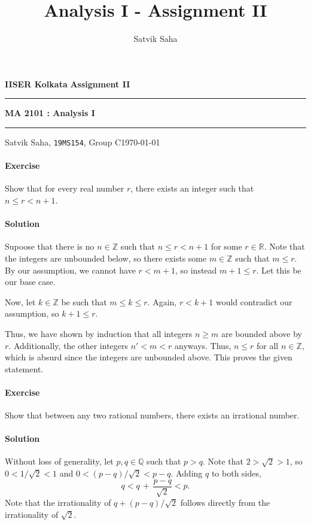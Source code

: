 \documentclass[10pt]{article}
\title{Analysis I - Assignment II}
\author{Satvik Saha}
\date{}
\newcounter{prob}
\def\problem{\stepcounter{prob}\paragraph{Exercise \arabic{prob}}}
\def\solution{\paragraph{Solution}}
\begin{document}
        \par\textbf{IISER Kolkata} \hfill \textbf{Assignment II}
        \vspace{3pt}
        \hrule
        \vspace{3pt}
        \begin{center}
                \LARGE{\textbf{MA 2101 : Analysis I}}
        \end{center}
        \vspace{3pt}
        \hrule
        \vspace{3pt}
        Satvik Saha, \texttt{19MS154}, Group C\hfill\today
        \vspace{20pt}

        \problem Show that for every real number $r$, there exists an integer such that $n \leq r < n + 1$.
        \solution Supoose that there is no $n \in \mathbb{Z}$ such that $n \leq r < n + 1$ for some $r \in \mathbb{R}$.
        Note that the integers are unbounded below, so there exists some $m \in \mathbb{Z}$ such that $m \leq r$.
        By our assumption, we cannot have $r < m + 1$, so instead $m + 1 \leq r$. Let this be our base case.

        Now, let $k \in \mathbb{Z}$ be such that $m \leq k \leq r$. Again, $r < k + 1$ would contradict our assumption, so $k + 1 \leq r$.

        Thus, we have shown by induction that all integers $n \geq m$ are bounded above by $r$. Additionally, the other integers $n' < m < r$
        anyways. Thus, $n \leq r$ for all $n \in \mathbb{Z}$, which is absurd since the integers are unbounded above.
        This proves the given statement.

        \problem Show that between any two rational numbers, there exists an irrational number.
        \solution Without loss of generality, let $p, q \in \mathbb{Q}$ such that $p > q$.
        Note that $2 > \sqrt{2} > 1$, so $0 < 1 /\sqrt{2} < 1$ and $0 < (p - q) /\sqrt{2} < p - q$.
        Adding $q$ to both sides,
        \[
                q < q \,+\, \frac{p - q}{\sqrt{2}} < p.
        \]
        Note that the irrationality of $q + (p - q)/\sqrt{2}$ follows directly from the irrationality of $\sqrt{2}$.
\end{document}
